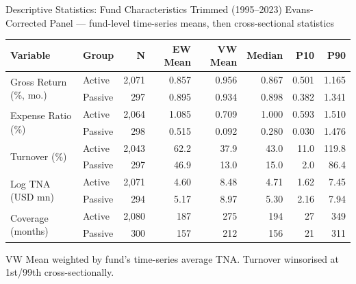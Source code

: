 \documentclass[aspectratio=169,10pt]{beamer}
\begin{document}
\begin{frame}{Descriptive Statistics: Fund Characteristics}
{\footnotesize Trimmed (1995–2023) Evans-Corrected Panel — fund-level time-series means, then cross-sectional statistics}
\vspace{4pt}
\begin{center}
\setlength{\tabcolsep}{5pt}
\begin{tabular}{llrrrrrr}
\toprule
\textbf{Variable} & \textbf{Group} & \textbf{N} & \textbf{EW Mean} & \textbf{VW Mean} & \textbf{Median} & \textbf{P10} & \textbf{P90}\\
\midrule
\multirow{2}{*}{Gross Return (\%, mo.)}
  & Active  & 2,071 & 0.857 & 0.956 & 0.867 & 0.501 & 1.165 \\
  & Passive & \phantom{2,}297 & 0.895 & 0.934 & 0.898 & 0.382 & 1.341 \\
\midrule
\multirow{2}{*}{Expense Ratio (\%)}
  & Active  & 2,064 & 1.085 & 0.709 & 1.000 & 0.593 & 1.510 \\
  & Passive & \phantom{2,}298 & 0.515 & 0.092 & 0.280 & 0.030 & 1.476 \\
\midrule
\multirow{2}{*}{Turnover (\%)}
  & Active  & 2,043 & 62.2 & 37.9 & 43.0 & 11.0 & 119.8 \\
  & Passive & \phantom{2,}297 & 46.9 & 13.0 & 15.0 & \phantom{0}2.0 & \phantom{0}86.4 \\
\midrule
\multirow{2}{*}{Log TNA (USD mn)}
  & Active  & 2,071 & 4.60 & 8.48 & 4.71 & 1.62 & 7.45 \\
  & Passive & \phantom{2,}294 & 5.17 & 8.97 & 5.30 & 2.16 & 7.94 \\
\midrule
\multirow{2}{*}{Coverage (months)}
  & Active  & 2,080 & 187 & 275 & 194 & \phantom{0}27 & 349 \\
  & Passive & \phantom{2,}300 & 157 & 212 & 156 & \phantom{0}21 & 311 \\
\bottomrule
\end{tabular}
\end{center}
\vspace{4pt}
{\footnotesize VW Mean weighted by fund's time-series average TNA. Turnover winsorised at 1st/99th cross-sectionally.}
\end{frame}
\end{document}
